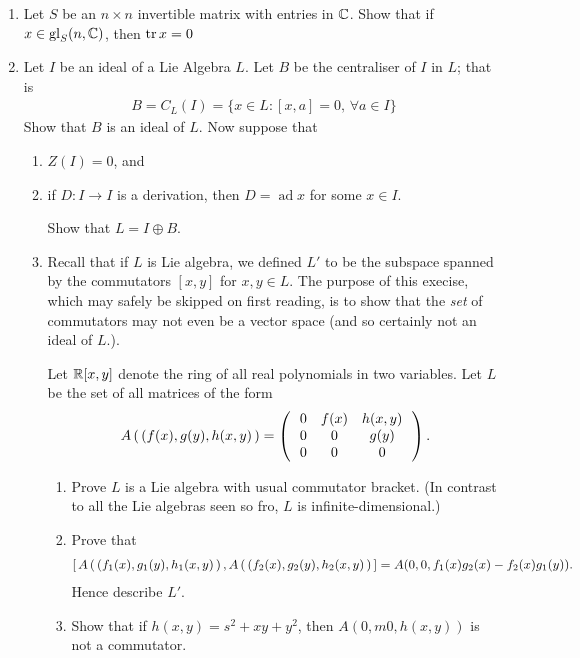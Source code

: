 \documentclass[12pt,a4paper]{report}
\newcommand{\GL}{\operatorname{gl}}
\newcommand{\AD}{\operatorname{ad}}
\begin{document}
\begin{enumerate}[label=2.\arabic*]
\item Let $S$ be an $n \times n$ invertible matrix with entries in $\mathbb{C}$.  Show that if $x \in \GL_S(n,\C)$, then $\operatorname{tr} x=0$

\item Let $I$ be an ideal of a Lie Algebra $L$.  Let $B$ be the centraliser of $I$ in $L$; that is 
\begin{align*}
	B = C_L(I) = \{x \in L : [x,a]=0, \, \forall a \in I\}
\end{align*}Show that $B$ is an ideal of $L$.  Now suppose that
\begin{enumerate}
	\item $Z(I)=0$, and
	\item if $D:I\to I$ is a derivation, then $D=\AD x$ for some $x \in I$.
	
	Show that $L=I\oplus B$.
	
	\item Recall that if $L$ is  Lie algebra, we defined $L'$ to be the subspace spanned by the commutators $[x,y]$ for $x,y\in L$.  The purpose of this execise, which may safely be skipped on first reading, is to show that the \textit{set} of commutators may not even be a vector space (and so certainly not an ideal of $L$.).
	
	Let $\mathbb{R}[x,y]$ denote the ring of all real polynomials in two variables.  Let $L$ be the set of all matrices of the form 
	\begin{align*}
		A\left (\, (f(x), g(y), h(x,y) \,\right ) = \left (\,  \begin{array}{c c c} 0&f(x)&h(x,y) \\ 0 & 0 & g(y) \\ 0 & 0 & 0 \end{array}  \,\right ).
	\end{align*}\begin{enumerate}[label=(\roman*)]
		\item Prove $L$ is a Lie algebra with usual commutator bracket. (In contrast to all the Lie algebras seen so fro, $L$ is infinite-dimensional.)
		\item Prove that
		\begin{align*}
			\left [\, A\left (\, (f_1(x), g_1(y), h_1(x,y) \,\right ), A\left (\, (f_2(x), g_2(y), h_2(x,y) \,\right ) \,\right ] = A(0,0,f_1(x)g_2(x)-f_2(x)g_1(y)).
		\end{align*}Hence describe $L'$.
		
		\item Show that if $h(x,y)=s^2+xy+y^2$, then $A(0,m0,h(x,y))$ is not a commutator.
	
	\end{enumerate}
\end{enumerate}


\end{enumerate}
\end{document}
